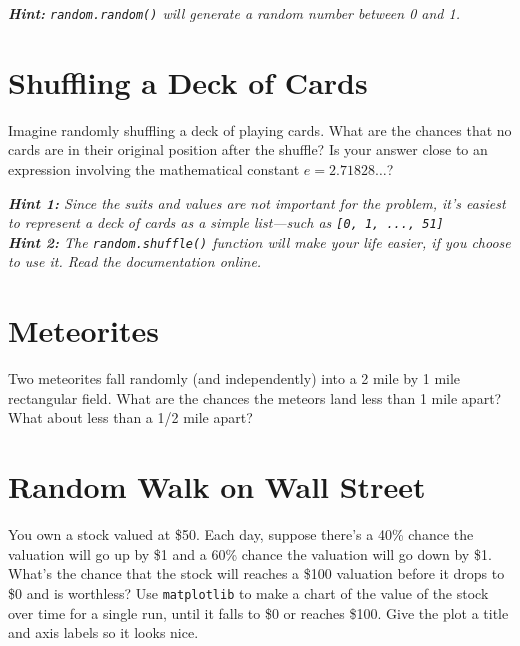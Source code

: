 \documentclass{hitec}
\begin{document}
\noindent \emph{\textbf{Hint:} \texttt{random.random()} will generate a random number between 0 and 1.}


\section{Shuffling a Deck of Cards}
Imagine randomly shuffling a deck of playing cards. What are the chances that no cards are in their original position after the shuffle? Is your answer close to an expression involving the mathematical constant $e=2.71828\ldots$?

\noindent \emph{\textbf{Hint 1:} Since the suits and values are not important for the problem, it's easiest to represent a deck of cards as a simple list---such as \texttt{[0, 1, ..., 51]}}\\
\noindent \emph{\textbf{Hint 2:} The \texttt{random.shuffle()} function will make your life easier, if you choose to use it. Read the documentation online.}

\section{Meteorites}
Two meteorites fall randomly (and independently) into a 2 mile by 1 mile rectangular field. What are the chances the meteors land less than 1 mile apart? What about less than a 1/2 mile apart?

\section{Random Walk on Wall Street}
You own a stock valued at \$50. Each day, suppose there's a 40\% chance the valuation will go up by \$1 and a 60\% chance the valuation will go down by \$1. What's the chance that the stock will reaches a \$100 valuation before it drops to \$0 and is worthless?
Use \texttt{matplotlib} to make a chart of the value of the stock over time for a single run, until it falls to \$0 or reaches \$100. Give the plot a title and axis labels so it looks nice.
\end{document}
